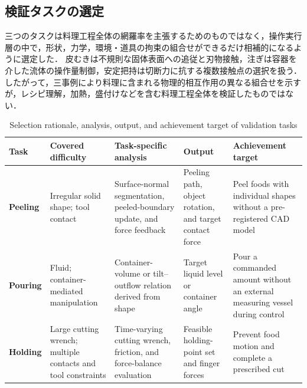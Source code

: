 \subsection{検証タスクの選定}

\begin{revisionblock}
三つのタスクは料理工程全体の網羅率を主張するためのものではなく，操作実行層の中で，形状，力学，環境・道具の拘束の組合せができるだけ相補的になるように選定した．
皮むきは不規則な固体表面への追従と刃物接触，注ぎは容器を介した流体の操作量制御，安定把持は切断力に抗する複数接触点の選択を扱う．
したがって，三事例により料理に含まれる物理的相互作用の異なる組合せを示すが，レシピ理解，加熱，盛付けなどを含む料理工程全体を検証したものではない．

\begin{table}[htbp]
  \centering
  \caption{Selection rationale, analysis, output, and achievement target of validation tasks}
  \label{tab:tasks}
  
  \scriptsize
  \setlength{\tabcolsep}{4pt}
  \renewcommand{\arraystretch}{0.95}
  \begin{tabularx}{.98\textwidth}{@{}p{}p{}Xp{}p{}@{}}
    \toprule
    Task & Covered difficulty & Task-specific analysis & Output & Achievement target \\
    \midrule
    \textbf{Peeling} & Irregular solid shape; tool contact & Surface-normal segmentation, peeled-boundary update, and force feedback & Peeling path, object rotation, and target contact force & Peel foods with individual shapes without a pre-registered CAD model \\
    \addlinespace
    \textbf{Pouring} & Fluid; container-mediated manipulation & Container-volume or tilt--outflow relation derived from shape & Target liquid level or container angle & Pour a commanded amount without an external measuring vessel during control \\
    \addlinespace
    \textbf{Holding} & Large cutting wrench; multiple contacts and tool constraints & Time-varying cutting wrench, friction, and force-balance evaluation & Feasible holding-point set and finger forces & Prevent food motion and complete a prescribed cut \\
    \bottomrule
  \end{tabularx}
\end{table}


\end{revisionblock}
